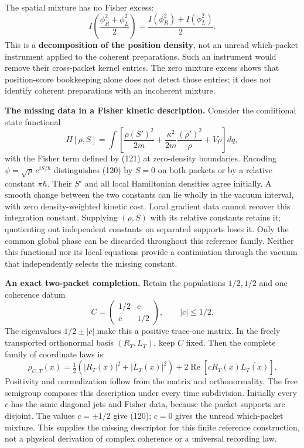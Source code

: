 \documentclass[11pt,a4paper]{article}
\begin{document}
The spatial mixture has no Fisher excess:
\[I\!\left(\frac{\phi_R^2+\phi_L^2}{2}\right)
 =\frac{I(\phi_R^2)+I(\phi_L^2)}2.\] This is a \textbf{decomposition of
the position density}, not an unread which-packet instrument applied to
the coherent preparations. Such an instrument would remove their
cross-packet kernel entries. The zero mixture excess shows that
position-score bookkeeping alone does not detect those entries; it does
not identify coherent preparations with an incoherent mixture.

\textbf{The missing data in a Fisher kinetic description.} Consider the
conditional state functional \[H[\rho,S]=\int\left[\frac{\rho(S')^2}{2m}
 +\frac{\kappa^2}{2m}\frac{(\rho')^2}{\rho}+V\rho\right]dq,\] with the
Fisher term defined by (121) at zero-density boundaries. Encoding
\(\psi=\sqrt\rho\,e^{iS/\hbar}\) distinguishes (120) by \(S=0\) on both
packets or by a relative constant \(\pi\hbar\). Their \(S'\) and all
local Hamiltonian densities agree initially. A smooth change between the
two constants can lie wholly in the vacuum interval, with zero
density-weighted kinetic cost. Local gradient data cannot recover this
integration constant. Supplying \((\rho,S)\) with its relative constants
retains it; quotienting out independent constants on separated supports
loses it. Only the common global phase can be discarded throughout this
reference family. Neither this functional nor its local equations
provide a continuation through the vacuum that independently selects the
missing constant.

\textbf{An exact two-packet completion.} Retain the populations
\(1/2,1/2\) and one coherence datum
\[C=\begin{pmatrix}1/2&c\\\bar c&1/2\end{pmatrix},
\qquad |c|\le1/2.\tag{123}\] The eigenvalues \(1/2\pm|c|\) make this a
positive trace-one matrix. In the freely transported orthonormal basis
\((R_T,L_T)\), keep \(C\) fixed. Then the complete family of coordinate
laws is \[\rho_{C,T}(x)=\tfrac12(|R_T(x)|^2+|L_T(x)|^2)
 +2\operatorname{Re}[cR_T(x)\overline{L_T(x)}].\tag{124}\] Positivity
and normalization follow from the matrix and orthonormality. The free
semigroup composes this description under every time subdivision.
Initially every \(c\) has the same diagonal jets and Fisher data,
because the packet supports are disjoint. The values \(c=\pm1/2\) give
(120); \(c=0\) gives the unread which-packet mixture. This supplies the
missing descriptor for this finite reference construction, not a
physical derivation of complex coherence or a universal recording law.
\end{document}
